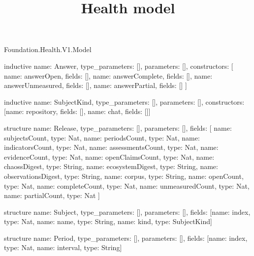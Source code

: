 \begin{lexlean}{Foundation.Health.V1.Model}
\title{Health model}
\begin{semanticmodule}
inductive{
  name: Answer,
  type_parameters: [],
  parameters: [],
  constructors: [
    {name: answerOpen, fields: []},
    {name: answerComplete, fields: []},
    {name: answerUnmeasured, fields: []},
    {name: answerPartial, fields: []}
  ]
}

inductive{
  name: SubjectKind,
  type_parameters: [],
  parameters: [],
  constructors: [{name: repository, fields: []}, {name: chat, fields: []}]
}

structure{
  name: Release,
  type_parameters: [],
  parameters: [],
  fields: [
    {name: subjectsCount, type: Nat},
    {name: periodsCount, type: Nat},
    {name: indicatorsCount, type: Nat},
    {name: assessmentsCount, type: Nat},
    {name: evidenceCount, type: Nat},
    {name: openClaimsCount, type: Nat},
    {name: chaossDigest, type: String},
    {name: ecosystemDigest, type: String},
    {name: observationsDigest, type: String},
    {name: corpus, type: String},
    {name: openCount, type: Nat},
    {name: completeCount, type: Nat},
    {name: unmeasuredCount, type: Nat},
    {name: partialCount, type: Nat}
  ]
}

structure{
  name: Subject,
  type_parameters: [],
  parameters: [],
  fields: [{name: index, type: Nat}, {name: name, type: String}, {name: kind, type: SubjectKind}]
}

structure{
  name: Period,
  type_parameters: [],
  parameters: [],
  fields: [{name: index, type: Nat}, {name: interval, type: String}]
}


\end{semanticmodule}
\end{lexlean}
